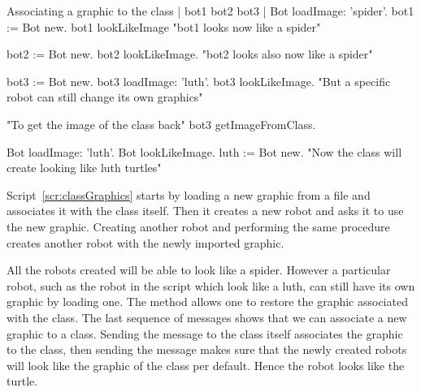 \begin{scriptwithtitle}{Associating a graphic to  the class}\label{scr:classGraphics}
| bot1 bot2 bot3 |
Bot loadImage: 'spider'.
bot1 := Bot new.
bot1 lookLikeImage
"bot1 looks now like a spider"

bot2 := Bot new.
bot2 lookLikeImage.
"bot2 looks also now like a spider"

bot3 := Bot new.
bot3 loadImage: 'luth'.
bot3 lookLikeImage.
"But a specific robot can still change its own graphics"

"To get the image of the class back"
bot3 getImageFromClass.

Bot loadImage: 'luth'.
Bot lookLikeImage.
luth := Bot new.
"Now the class will create looking like luth turtles"
\end{scriptwithtitle}

Script~\ref{scr:classGraphics} starts by loading a new graphic from a file and associates it with the class itself. Then it creates a new robot  and asks it to use the new graphic. Creating another robot  and performing the same procedure creates another robot with the newly imported graphic. 

All the robots created will be able to look like a spider. However a particular robot, such as the robot   in the script which look like a luth, can still have its own graphic by loading one. The method   allows one to restore the graphic associated with the class. The last sequence of messages shows that we can associate a new graphic to a class. Sending the message  to the class  itself associates the graphic to the class, then sending the message  makes sure that the newly created robots will look like the graphic of the class per default. Hence the robot  looks like the turtle. 





